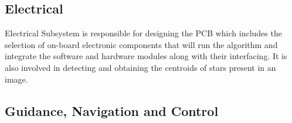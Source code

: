 \documentclass[../../main.tex]{subfiles}
\begin{document}
    
    \subsection{Electrical}
        Electrical Subsystem is responsible for designing the PCB which includes the selection of on-board electronic components that will run the algorithm and integrate the software and hardware modules along with their interfacing. It is also involved in detecting and obtaining the centroids of stars present in an image.

    \subsection{Guidance, Navigation and Control}
\end{document}

